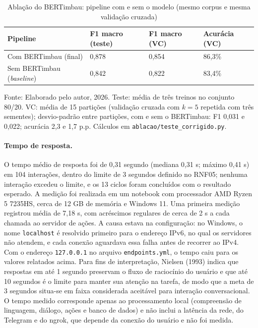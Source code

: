 \documentclass[12pt,a4paper]{extarticle}
\begin{document}
\begin{table}[H]
\centering
\caption{Ablação do BERTimbau: pipeline com e sem o modelo (mesmo corpus e mesma validação cruzada)}
\label{tab:ablacao}
\small
\begin{tabular}{p{5cm}p{2.4cm}p{2.4cm}p{2.4cm}}
\hline
\textbf{Pipeline} & \textbf{F1 macro (teste)} & \textbf{F1 macro (VC)} & \textbf{Acurácia (VC)} \\
\hline
Com BERTimbau (final) & 0,878 & 0,854 & 86,3\% \\
Sem BERTimbau (\textit{baseline}) & 0,842 & 0,822 & 83,4\% \\
\hline
\end{tabular}
\vspace{0.3cm}

\footnotesize{Fonte: Elaborado pelo autor, 2026. Teste: média de três treinos no conjunto 80/20. VC: média de 15 partições (validação cruzada com $k=5$ repetida com três sementes); desvio-padrão entre partições, com e sem o BERTimbau: F1 0,031 e 0,022; acurácia 2,3 e 1,7 p.p. Cálculos em \texttt{ablacao/teste\_corrigido.py}.}
\end{table}

\paragraph{Tempo de resposta.}
O tempo médio de resposta foi de 0,31 segundo (mediana 0,31 s; máximo 0,41 s) em 104 interações, dentro do limite de 3 segundos definido no RNF05; nenhuma interação excedeu o limite, e os 13 ciclos foram concluídos com o resultado esperado. A medição foi realizada em um notebook com processador AMD Ryzen 5 7235HS, cerca de 12 GB de memória e Windows 11.
Uma primeira medição registrou média de 7,18 s, com acréscimos regulares de cerca de 2 s a cada chamada ao servidor de ações. A causa estava na configuração: no Windows, o nome \texttt{localhost} é resolvido primeiro para o endereço IPv6, no qual os servidores não atendem, e cada conexão aguardava essa falha antes de recorrer ao IPv4. Com o endereço \texttt{127.0.0.1} no arquivo \texttt{endpoints.yml}, o tempo caiu para os valores relatados acima.
Para fins de interpretação, Nielsen (1993) indica que respostas em até 1 segundo preservam o fluxo de raciocínio do usuário e que até 10 segundos é o limite para manter sua atenção na tarefa, de modo que a meta de 3 segundos situa-se em faixa considerada aceitável para interação conversacional. O tempo medido corresponde apenas ao processamento local (compreensão de linguagem, diálogo, ações e banco de dados) e não inclui a latência da rede, do Telegram e do ngrok, que depende da conexão do usuário e não foi medida.
\end{document}
